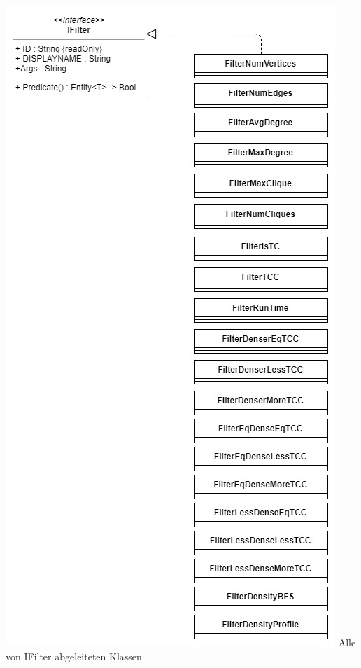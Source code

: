 \documentclass[13pt]{scrreprt}
\begin{document}
    \begin{center}
	\includegraphics[scale=0.6,center]{FilterImplementation.jpg}	
		Alle von IFilter abgeleiteten Klassen
	\end{center}
	
\end{document}

